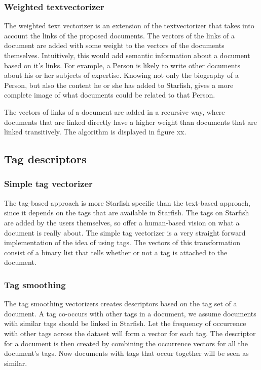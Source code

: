 \subsubsection{Weighted textvectorizer}
The weighted text vectorizer is an extension of the textvectorizer that takes
into account the links of the proposed documents. The vectors of the links of a
document are added with some weight to the vectors of the documents themselves.
Intuitively, this would add semantic information about a document based on it's
links. For example, a Person is likely to write other documents about his or
her subjects of expertise. Knowing not only the biography of a Person, but also
the content he or she has added to Starfish, gives a more complete image of
what documents could be related to that Person.

The vectors of links of a document are added in a recursive way, where
documents that are linked directly have a higher weight than documents that are
linked transitively. The algorithm is displayed in figure xx.

\subsection{Tag descriptors}
\subsubsection{Simple tag vectorizer}
The tag-based approach is more Starfish specific than the text-based approach,
since it depends on the tags that are available in Starfish. The tags on
Starfish are added by the users themselves, so offer a human-based vision on
what a document is really about. The simple tag vectorizer is a very straight
forward implementation of the idea of using tags. The vectors of this
transformation consist of a binary list that tells whether or not a tag is
attached to the document. 

\subsubsection{Tag smoothing}
The tag smoothing vectorizers creates descriptors based on the tag set of a
document. A tag co-occurs with other tags in a document, we assume documents
with similar tags should be linked in Starfish. Let the frequency of occurrence
with other tags across the dataset will form a vector for each tag. The
descriptor for a document is then created by combining the occurrence vectors
for all the document's tags. Now documents with tags that occur together will
be seen as similar.

